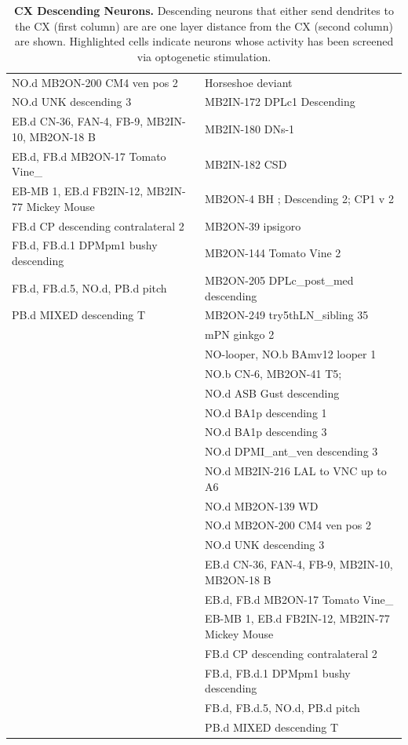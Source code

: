 \begin{table}[H]
{\begin{tabular}{p{}|p{}}
        NO.d MB2ON-200 CM4 ven pos 2 & Horseshoe deviant \\
        NO.d UNK descending 3 & \cellcolor{cxhl} MB2IN-172 DPLc1 Descending \\
        EB.d CN-36, FAN-4, FB-9, MB2IN-10, MB2ON-18 B & MB2IN-180 DNs-1 \\
        EB.d, FB.d MB2ON-17 Tomato Vine\_ & MB2IN-182 CSD \\
        EB-MB 1, EB.d FB2IN-12, MB2IN-77 Mickey Mouse & MB2ON-4 BH ; Descending 2; CP1 v 2 \\
        FB.d CP descending contralateral 2 & \cellcolor{cxhl} MB2ON-39 ipsigoro \\
        FB.d, FB.d.1 DPMpm1 bushy descending & MB2ON-144 Tomato Vine 2 \\
        FB.d, FB.d.5, NO.d, PB.d pitch & MB2ON-205 DPLc\_post\_med descending \\
        PB.d MIXED descending T & MB2ON-249 try5thLN\_sibling 35 \\
        & mPN ginkgo 2 \\
        & NO-looper, NO.b BAmv12 looper 1 \\
        & NO.b CN-6, MB2ON-41 T5; \\
        & NO.d ASB Gust descending \\
        & NO.d BA1p descending 1 \\
        & NO.d BA1p descending 3 \\
        & \cellcolor{cxhl} NO.d DPMI\_ant\_ven descending 3 \\
        & NO.d MB2IN-216 LAL to VNC up to A6 \\
        & NO.d MB2ON-139 WD \\
        & NO.d MB2ON-200 CM4 ven pos 2 \\
        & NO.d UNK descending 3 \\
        & EB.d CN-36, FAN-4, FB-9, MB2IN-10, MB2ON-18 B \\
        & EB.d, FB.d MB2ON-17 Tomato Vine\_ \\
        & EB-MB 1, EB.d FB2IN-12, MB2IN-77 Mickey Mouse \\
        & FB.d CP descending contralateral 2 \\
        & FB.d, FB.d.1 DPMpm1 bushy descending \\
        & FB.d, FB.d.5, NO.d, PB.d pitch \\
        & PB.d MIXED descending T \\
        \bottomrule
    \end{tabular}%
    }
    \caption[CX Descending Neurons]{\textbf{CX Descending Neurons.} Descending neurons that either send dendrites to the CX (first column) are are one layer distance from the CX (second column) are shown. Highlighted cells indicate neurons whose activity has been screened via optogenetic stimulation.}
    \label{CXDescending}
\end{table}


